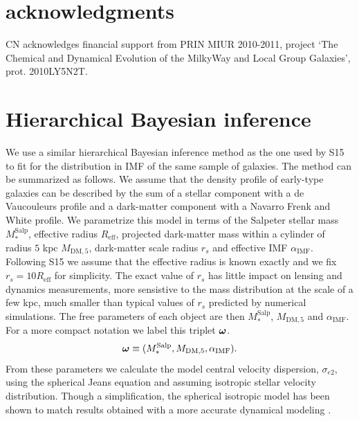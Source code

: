 \documentclass[usenatbib]{mnras}
\newcommand{\boldsymbol}[1]{\mbox{\boldmath{${#1}$}}}
\def\mdm{M_{\mathrm{DM}}}
\def\reff{R_{\mathrm{eff}}}
\def\msalp{M_*^{\mathrm{Salp}}}
\def\aimf{\alpha_{\mathrm{IMF}}}
\def\mdm{M_{\mathrm{DM},5}}
\def\sigmaee{\sigma_{e2}}
\def\indpar{\boldsymbol{\omega}}
\begin{document}
\section*{acknowledgments}

CN acknowledges financial support from PRIN MIUR 2010-2011,
project ‘The Chemical and Dynamical Evolution of the MilkyWay
and Local Group Galaxies’, prot. 2010LY5N2T.



%





\appendix
\onecolumn
\section{Hierarchical Bayesian inference}\label{sect:appendix}
We use a similar hierarchical Bayesian inference method as the one
used by S15 to fit for the distribution in IMF of the same sample of
galaxies. The method can be summarized as follows.  We assume that the
density profile of early-type galaxies can be described by the sum of
a stellar component with a de Vaucouleurs profile and a dark-matter
component with a Navarro Frenk and White \citep{NFW97} profile.  We
parametrize this model in terms of the Salpeter stellar mass $\msalp$,
effective radius $\reff$, projected dark-matter mass within a cylinder
of radius $5$ kpc $\mdm$, dark-matter scale radius $r_s$ and effective
IMF $\aimf$.  Following S15 we assume that the effective radius is
known exactly and we fix $r_s = 10\reff$ for simplicity. The exact
value of $r_s$ has little impact on lensing and dynamics measurements,
more sensistive to the mass distribution at the scale of a few kpc,
much smaller than typical values of $r_s$ predicted by numerical
simulations.  The free parameters of each object are then $\msalp$,
$\mdm$ and $\aimf$. For a more compact notation we label this triplet $\indpar$.
\begin{equation}
\indpar \equiv(\msalp, \mdm, \aimf).
\end{equation}
From these parameters we calculate the model
central velocity dispersion, $\sigmaee$, using the spherical Jeans
equation and assuming isotropic stellar velocity distribution.
Though a simplification, the spherical isotropic model has been shown
to match results obtained with a more accurate dynamical modeling
\citep{Bar++11}.
\end{document}
